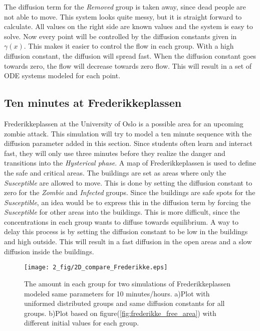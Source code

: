 \documentclass[%
twoside,                 %
final,                   %
chapterprefix=true,      %
open=right               %
10pt]{book}
\begin{document}
The diffusion term for the \emph{Removed} group is taken away, since dead people are not able to move. This system looks quite messy, but it is straight forward to calculate. All values on the right side are known values and the system is easy to solve. Now every point will be controlled by the diffusion constants given in $\gamma(x)$. This makes it easier to control the flow in each group. With a high diffusion constant, the diffusion will spread fast. When the diffusion constant goes towards zero, the flow will decrease towards zero flow. This will result in a set of ODE systems modeled for each point.

\subsection{Ten minutes at Frederikkeplassen}
Frederikkeplassen at the University of Oslo is a possible area for an upcoming zombie attack. This simulation will try to model a ten minute sequence with the diffusion parameter added in this section. Since students often learn and interact fast, they will only use three minutes before they realize the danger and transitions into the \emph{Hysterical phase}. A map of Frederikkeplassen is used to define the safe and critical areas. The buildings are set as areas where only the \emph{Susceptible} are allowed to move. This is done by setting the diffusion constant to zero for the \emph{Zombie} and \emph{Infected} groups. Since the buildings are safe spots for the \emph{Susceptible}, an idea would be to express this in the diffusion term by forcing the \emph{Susceptible} for other areas into the buildings. This is more difficult, since the concentrations in each group wants to diffuse towards equilibrium. A way to delay this process is by setting the diffusion constant to be low in the buildings and high outside. This will result in a fast diffusion in the open areas and a slow diffusion inside the buildings. 


\begin{figure}[ht]
  \centerline{\texttt{[image: 2\_fig/2D\_compare\_Frederikke.eps]}}
  \caption{
  \label{fig:frederikke_numbers} The amount in each group for two simulations of Frederikkeplassen modeled same parameters for 10 minutes/hours. a)Plot with uniformed distributed groups and same diffusion constants for all groups. b)Plot based on figure(\ref{fig:frederikke_free_area}) with different initial values for each group.
  }
\end{figure}
\end{document}
